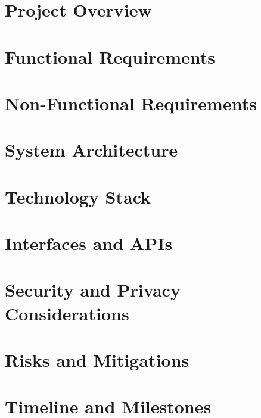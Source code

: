 \section{Project Overview}

\section{Functional Requirements}

\section{Non-Functional Requirements}

\section{System Architecture}

\section{Technology Stack}

\section{Interfaces and APIs}

\section{Security and Privacy Considerations}

\section{Risks and Mitigations}

\section{Timeline and Milestones}

